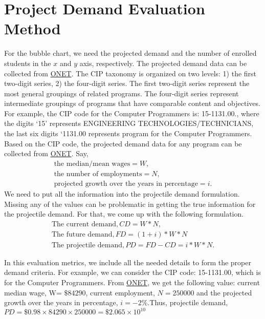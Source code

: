 \documentclass{article}
\begin{document}
\maketitle
\section{Project Demand Evaluation Method}
For the bubble chart, we need the projected demand and the number of enrolled students in the $x$ and $y$ axis, respectively. The projected demand data can be collected from \href{https://www.onetonline.org/}{ONET}. The CIP taxonomy is organized on two levels: 1) the first two-digit series, 2) the four-digit series. The first two-digit series represent the most general groupings of related programs. The four-digit series represent intermediate groupings of programs that have comparable content and objectives. For example, the CIP code for the Computer Programmers is: 15-1131.00., where the digits ‘15’ represents ENGINEERING TECHNOLOGIES/TECHNICIANS, the last six digits ‘1131.00 represents program for the Computer Programmers. Based on the CIP code, the projected demand data for any program can be collected from \href{https://www.onetonline.org/}{ONET}. Say,
\begin{align*}
\text{the median/mean wages}= W,\\
\text{the number of employments}=N,\\
\text{projected growth over the years in percentage} = i.
\end{align*}
We need to put all the information into the projectile demand formulation. Missing any of the values can be problematic in getting the true information for the projectile demand. For that, we come up with the following formulation.
\begin{align*}
\text{The current demand}, CD=W*N,\\
\text{The future demand},  FD=(1+i)*W*N\\
\text{The projectile demand}, PD=FD-CD=i*W*N.  
\end{align*}

In this evaluation metrics, we include all the needed details to form the proper demand criteria. 
For example, we can consider the CIP code: 15-1131.00, which is for the Computer Programmers. From \href{https://www.onetonline.org/link/summary/15-1131.00}{ONET}, we get the following value: current median wage, W= $\$84290$, current employment, $N=250000$ and the projected growth over the years in percentage, $i=-2\%$.Thus, projectile demand, $PD=\$0.98\times84290\times250000= \$2.065\times10^{10}$
\end{document}

